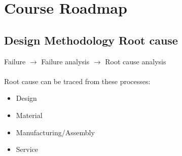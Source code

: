 \documentclass[11pt]{article}
\begin{document}
\section{Course Roadmap}
\subsection{Design Methodology Root cause}
Failure $\rightarrow$ Failure analysis $\rightarrow$ Root cause analysis
\\~\\
Root cause can be traced from these processes:
\begin{itemize}
    \item Design
    \item Material
    \item Manufacturing/Assembly
    \item Service
\end{itemize}
\end{document}
